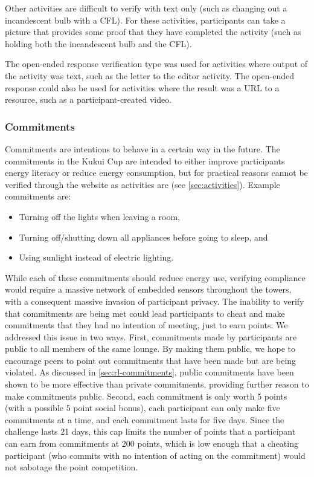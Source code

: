 Other activities are difficult to verify with text only (such as changing out a incandescent bulb with a CFL). For these activities, participants can take a picture that provides some proof that they have completed the activity (such as holding both the incandescent bulb and the CFL).

The open-ended response verification type was used for activities where output of the activity was text, such as the letter to the editor activity. The open-ended response could also be used for activities where the result was a URL to a resource, such as a participant-created video.


\subsubsection{Commitments}
\label{sec:commitments}

Commitments are intentions to behave in a certain way in the future. The commitments in the Kukui Cup are intended to either improve participants energy literacy or reduce energy consumption, but for practical reasons cannot be verified through the website as activities are (see \autoref{sec:activities}). Example commitments are:

\begin{itemize}
	\item Turning off the lights when leaving a room,
	\item Turning off/shutting down all appliances before going to sleep, and
	\item Using sunlight instead of electric lighting.
\end{itemize}

While each of these commitments should reduce energy use, verifying compliance would require a massive network of embedded sensors throughout the towers, with a consequent massive invasion of participant privacy. The inability to verify that commitments are being met could lead participants to cheat and make commitments that they had no intention of meeting, just to earn points. We addressed this issue in two ways. First, commitments made by participants are public to all members of the same lounge. By making them public, we hope to encourage peers to point out commitments that have been made but are being violated. As discussed in \autoref{sec:rl-commitments}, public commitments have been shown to be more effective than private commitments, providing further reason to make commitments public. Second, each commitment is only worth 5 points (with a possible 5 point social bonus), each participant can only make five commitments at a time, and each commitment lasts for five days. Since the challenge lasts 21 days, this cap limits the number of points that a participant can earn from commitments at 200 points, which is low enough that a cheating participant (who commits with no intention of acting on the commitment) would not sabotage the point competition.

